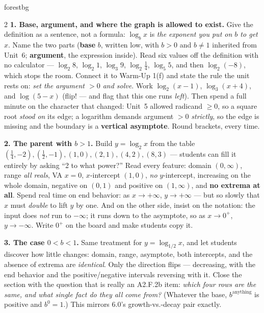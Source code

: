 \documentclass[10pt]{article}
\begin{document}
\begin{skillbox}[Lesson]{forestbg}
\begin{multicols}{2}
\textbf{1. Base, argument, and where the graph is allowed to exist.} Give the definition as a
sentence, not a formula: $\log_b x$ is \emph{the exponent you put on $b$ to get $x$}. Name the two
parts (\textbf{base} $b$, written low, with $b>0$ and $b\ne1$ inherited from Unit~6; \textbf{argument},
the expression inside). Read six values off the definition with no calculator --- $\log_2 8$,
$\log_2 1$, $\log_3 9$, $\log_2\frac14$, $\log_5 5$, and then $\log_2(-8)$, which stops the room.
Connect it to Warm-Up 1(f) and state the rule the unit rests on: \emph{set the argument $>0$ and
solve}. Work $\log_2(x-1)$, $\log_3(x+4)$, and $\log(5-x)$ (flip! --- and flag that this one runs
\emph{left}). Then spend a full minute on the character that changed: Unit~5 allowed radicand $\ge0$,
so a square root \emph{stood on} its edge; a logarithm demands argument $>0$ \emph{strictly}, so the
edge is missing and the boundary is a \textbf{vertical asymptote}. Round brackets, every time.

\textbf{2. The parent with $b>1$.} Build $y=\log_2 x$ from the table
$(\frac14,-2),(\frac12,-1),(1,0),(2,1),(4,2),(8,3)$ --- students can fill it entirely by asking ``2 to
what power?'' Read every feature: domain $(0,\infty)$, range \emph{all reals}, VA $x=0$, $x$-intercept
$(1,0)$, \emph{no} $y$-intercept, increasing on the whole domain, negative on $(0,1)$ and positive on
$(1,\infty)$, and \textbf{no extrema at all}. Spend real time on end behavior: as $x\to+\infty$,
$y\to+\infty$ --- but so slowly that $x$ must \emph{double} to lift $y$ by one. And on the other side,
insist on the notation: the input does \emph{not} run to $-\infty$; it runs down to the asymptote, so
as $x\to 0^{+}$, $y\to-\infty$. Write $0^{+}$ on the board and make students copy it.

\columnbreak

\textbf{3. The case $0<b<1$.} Same treatment for $y=\log_{1/2}x$, and let students discover how
little changes: domain, range, asymptote, both intercepts, and the absence of extrema are
\emph{identical}. Only the direction flips --- decreasing, with the end behavior and the
positive/negative intervals reversing with it. Close the section with the question that is really an
A2.F.2b item: \emph{which four rows are the same, and what single fact do they all come from?}
(Whatever the base, $b^{\text{anything}}$ is positive and $b^0=1$.) This mirrors 6.0's growth-vs.-decay
pair exactly.


\end{multicols}
\end{skillbox}
\end{document}
